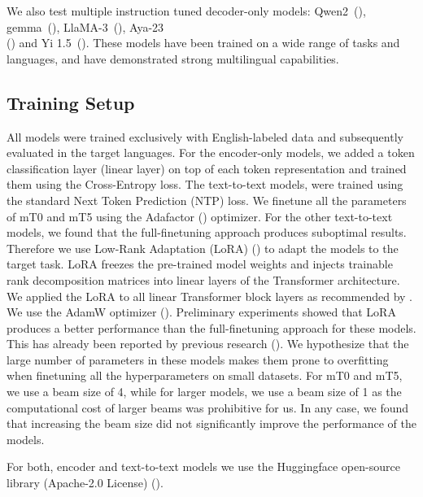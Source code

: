 We also test multiple instruction tuned decoder-only models: Qwen2~(\cite{yang2024qwen2technicalreport}), gemma~(\cite{gemmateam2024gemmaopenmodelsbased}), LlaMA-3~(\cite{llama3modelcard}), Aya-23\\(\cite{aya23}) and Yi 1.5~(\cite{ai2024yiopenfoundationmodels}). These models have been trained on a wide range of tasks and languages, and have demonstrated strong multilingual capabilities.

\subsection{Training Setup}

All models were trained exclusively with English-labeled data and subsequently evaluated in the target languages. For the encoder-only models, we added a token classification layer (linear layer) on top of each token representation and trained them using the Cross-Entropy loss. The text-to-text models, were trained using the standard Next Token Prediction (NTP) loss. 
We finetune all the parameters of mT0 and mT5 using the Adafactor (\cite{DBLP:conf/icml/ShazeerS18}) optimizer. For the other text-to-text models, we found that the full-finetuning approach produces suboptimal results.
Therefore we use Low-Rank Adaptation (LoRA) (\cite{DBLP:journals/corr/abs-2106-09685}) to adapt the models to the target task. LoRA freezes the pre-trained model weights and injects trainable rank decomposition matrices into linear layers of the Transformer architecture.  We applied the LoRA to all linear Transformer block layers as recommended by \cite{qlora}. We use the AdamW  optimizer (\cite{DBLP:journals/corr/abs-1711-05101}). Preliminary experiments showed that LoRA produces a better performance than the full-finetuning approach for these models.  This has already been reported by previous research (\cite{sainz2024gollie}). We hypothesize that the large number of parameters in these models makes them prone to overfitting when finetuning all the hyperparameters on small datasets. For mT0 and mT5, we use a beam size of 4, while for larger models, we use a beam size of 1 as the computational cost of larger beams was prohibitive for us. In any case, we found that increasing the beam size did not significantly improve the performance of the models.

For both, encoder and text-to-text models we use the Huggingface open-source library (Apache-2.0 License) (\cite{DBLP:journals/corr/abs-1910-03771}).




